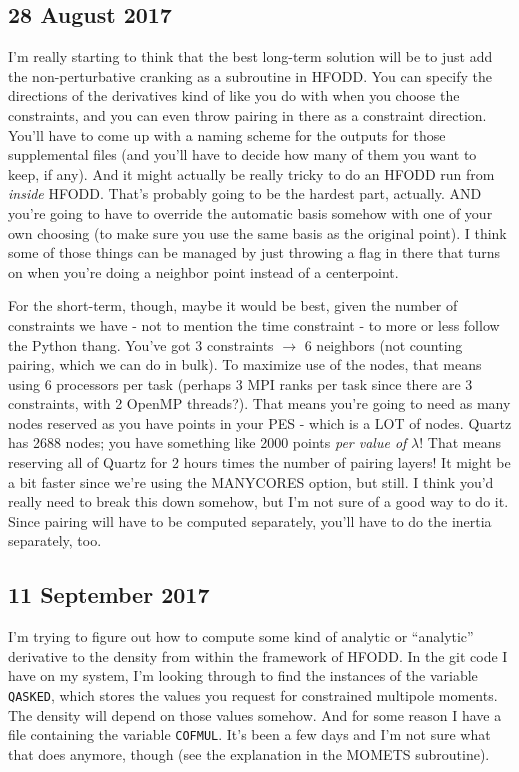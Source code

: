 \documentclass[]{report}
\begin{document}
\subsection*{28 August 2017}
I'm really starting to think that the best long-term solution will be to just add the non-perturbative cranking as a subroutine in HFODD. You can specify the directions of the derivatives kind of like you do with when you choose the constraints, and you can even throw pairing in there as a constraint direction. You'll have to come up with a naming scheme for the outputs for those supplemental files (and you'll have to decide how many of them you want to keep, if any). And it might actually be really tricky to do an HFODD run from \textit{inside} HFODD. That's probably going to be the hardest part, actually. AND you're going to have to override the automatic basis somehow with one of your own choosing (to make sure you use the same basis as the original point). I think some of those things can be managed by just throwing a flag in there that turns on when you're doing a neighbor point instead of a centerpoint.

For the short-term, though, maybe it would be best, given the number of constraints we have - not to mention the time constraint - to more or less follow the Python thang. You've got 3 constraints $\rightarrow$ 6 neighbors (not counting pairing, which we can do in bulk). To maximize use of the nodes, that means using 6 processors per task (perhaps 3 MPI ranks per task since there are 3 constraints, with 2 OpenMP threads?). That means you're going to need as many nodes reserved as you have points in your PES - which is a LOT of nodes. Quartz has 2688 nodes; you have something like 2000 points \textit{per value of} $\lambda$! That means reserving all of Quartz for 2 hours times the number of pairing layers! It might be a bit faster since we're using the MANYCORES option, but still. I think you'd really need to break this down somehow, but I'm not sure of a good way to do it. Since pairing will have to be computed separately, you'll have to do the inertia separately, too.

\subsection*{11 September 2017}
I'm trying to figure out how to compute some kind of analytic or ``analytic'' derivative to the density from within the framework of HFODD. In the git code I have on my system, I'm looking through to find the instances of the variable \texttt{QASKED}, which stores the values you request for constrained multipole moments. The density will depend on those values somehow. And for some reason I have a file containing the variable \texttt{COFMUL}. It's been a few days and I'm not sure what that does anymore, though (see the explanation in the MOMETS subroutine).
\end{document}
